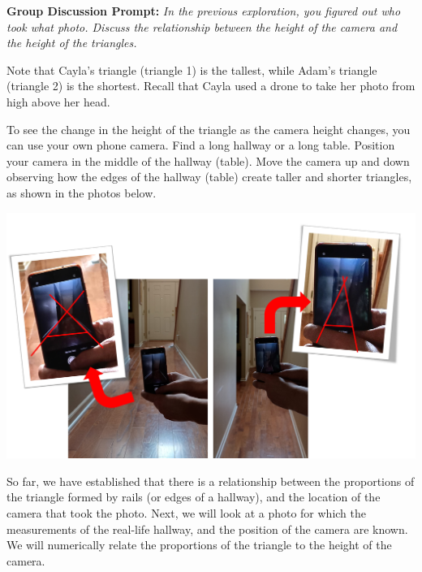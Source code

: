 \documentclass{ximera}
\begin{document}
\begin{exploration}
\textbf{Group Discussion Prompt:}
\emph{In the previous exploration, you figured out who took what photo.  Discuss the relationship between the height of the camera and the height of the triangles.}

\begin{hint}
    Note that Cayla's triangle (triangle 1) is the tallest, while Adam's triangle (triangle 2) is the shortest.  Recall that Cayla used a drone to take her photo from high above her head.  
\end{hint}

To see the change in the height of the triangle as the camera height changes, you can use your own phone camera.  Find a long hallway or a long table.  Position your camera in the middle of the hallway (table).  Move the camera up and down observing how the edges of the hallway (table) create taller and shorter triangles, as shown in the photos below.

\begin{image}
         \includegraphics[width=6in]{doItYourself.jpg}
\end{image}

\begin{multipleChoice}
    \end{multipleChoice}

\end{exploration}

So far, we have established that there is a relationship between the proportions of the triangle formed by rails (or edges of a hallway), and the location of the camera that took the photo.  Next, we will look at a photo for which the measurements of the real-life hallway, and the position of the camera are known.  We will numerically relate the proportions of the triangle to the height of the camera.
\end{document}
